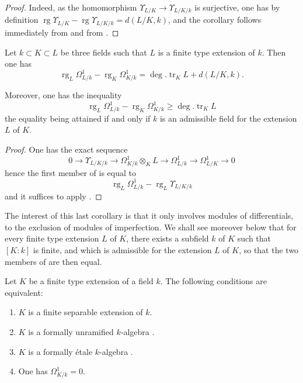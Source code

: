 \begin{proof}
Indeed, as the homomorphism $\Upsilon_{L/K}\to\Upsilon_{L/K/k}$ is surjective, one has by definition  $\operatorname{rg}\Upsilon_{L/K}-\operatorname{rg}\Upsilon_{L/K/k}=d(L/K,k)$, and the corollary follows immediately from  and from .
\end{proof}

\begin{corollary}[21.7.3]
\label{0.21.7.3}
Let $k\subset K\subset L$ be three fields such that $L$ is a finite type extension of $k$.
Then one has
\begin{equation}
\tag{21.7.3.1}
  \label{0.21.7.3.1}
  \operatorname{rg}_L\Omega^1_{L/k}-\operatorname{rg}_K\Omega^1_{K/k}=\deg.\operatorname{tr}_K L+d(L/K,k).
\end{equation}

Moreover, one has the inequality
\begin{equation}
\tag{21.7.3.2}
  \label{0.21.7.3.2}
  \operatorname{rg}_L\Omega^1_{L/k}-\operatorname{rg}_K\Omega^1_{K/k}\geqslant\deg.\operatorname{tr}_K L
\end{equation}
the equality being attained if and only if $k$ is an admissible field for the extension $L$ of $K$.
\end{corollary}

\begin{proof}
One has the exact sequence 
\[
  0\to\Upsilon_{L/K/k}\to\Omega^1_{K/k}\otimes_K L\to\Omega^1_{L/k}\to\Omega^1_{L/K}\to 0
\]
hence the first member of  is equal to
\[
  \operatorname{rg}_L\Omega^1_{L/k}-\operatorname{rg}_L\Upsilon_{L/K/k}
\]
and it suffices to apply .
\end{proof}

The interest of this last corollary is that it only involves modules of differentials, to the exclusion of modules of imperfection.
We shall see moreover below  that for every finite type extension $L$ of $K$, there exists a subfield $k$ of $K$ such that $[K:k]$ is finite, and which is admissible for the extension $L$ of $K$, so that the two members of  are then equal.

\begin{corollary}[21.7.4]
\label{0.21.7.4}
Let $K$ be a finite type extension of a field $k$.
The following conditions are equivalent:
\begin{enumerate}
  \item[\rm a)] $K$ is a finite separable extension of $k$.
  \item[\rm b)] $K$ is a formally unramified $k$-algebra .
  \item[\rm c)] $K$ is a formally \'etale $k$-algebra .
  \item[\rm d)] One has $\Omega^1_{K/k}=0$.
\end{enumerate}
\end{corollary}

